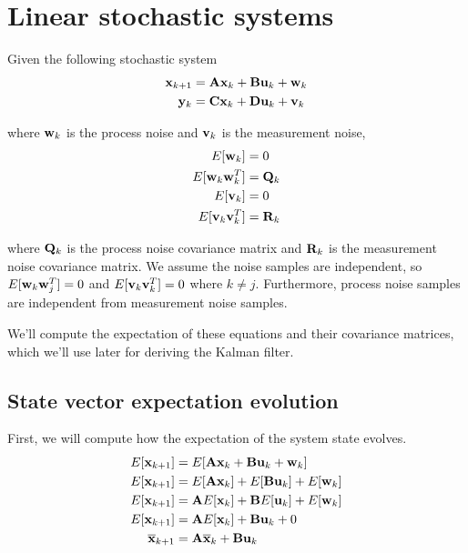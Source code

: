 \section{Linear stochastic systems}

Given the following stochastic system
\begin{align*}
  \mathbf{x}_{k+1} &= \mathbf{A}\mathbf{x}_k + \mathbf{B}\mathbf{u}_k + \mathbf{w}_k \\
  \mathbf{y}_k &= \mathbf{C}\mathbf{x}_k + \mathbf{D}\mathbf{u}_k + \mathbf{v}_k
\end{align*}

where $\mathbf{w}_k$ is the process noise and $\mathbf{v}_k$ is the measurement noise,
 
\begin{align*}
  E[\mathbf{w}_k] &= 0 \\
  E[\mathbf{w}_k\mathbf{w}_k^T] &= \mathbf{Q}_k \\
  E[\mathbf{v}_k] &= 0 \\
  E[\mathbf{v}_k\mathbf{v}_k^T] &= \mathbf{R}_k
\end{align*}

where $\mathbf{Q}_k$ is the process noise covariance matrix and $\mathbf{R}_k$ is the
measurement noise covariance matrix. We assume the noise samples are
independent, so $E[\mathbf{w}_k\mathbf{w}_j^T] = 0$ and $E[\mathbf{v}_k\mathbf{v}_k^T] = 0$
where $k \neq j$. Furthermore, process noise samples are independent from
measurement noise samples.

We'll compute the expectation of these equations and their covariance matrices,
which we'll use later for deriving the Kalman filter.

\subsection{State vector expectation evolution}

First, we will compute how the expectation of the \gls{system} \gls{state}
evolves.
\begin{align*}
  E[\mathbf{x}_{k+1}] &= E[\mathbf{A}\mathbf{x}_k + \mathbf{B}\mathbf{u}_k + \mathbf{w}_k] \\
  E[\mathbf{x}_{k+1}] &= E[\mathbf{A}\mathbf{x}_k] + E[\mathbf{B}\mathbf{u}_k] +
    E[\mathbf{w}_k] \\
  E[\mathbf{x}_{k+1}] &= \mathbf{A}E[\mathbf{x}_k] + \mathbf{B}E[\mathbf{u}_k] +
    E[\mathbf{w}_k] \\
  E[\mathbf{x}_{k+1}] &= \mathbf{A}E[\mathbf{x}_k] + \mathbf{B}\mathbf{u}_k + 0 \\
  \overline{\mathbf{x}}_{k+1} &= \mathbf{A}\overline{\mathbf{x}}_k + \mathbf{B}\mathbf{u}_k \\
\end{align*}

